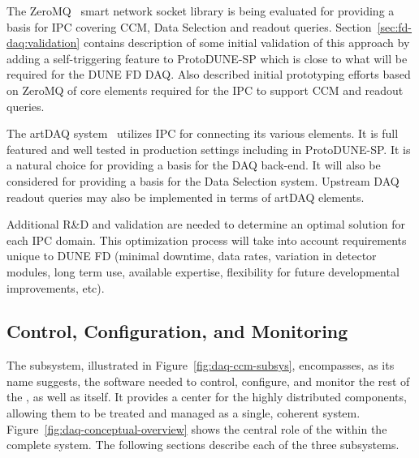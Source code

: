 The ZeroMQ~\cite{zeromq} smart network socket library is being evaluated for providing a basis for IPC covering CCM, Data Selection and readout queries.  
Section~\ref{sec:fd-daq:validation} contains description of some initial validation of this approach by adding a self-triggering feature to ProtoDUNE-SP which is close to what will be required for the DUNE FD DAQ.  Also described initial prototyping efforts based on ZeroMQ of core elements required for the IPC to support CCM and readout queries.

The artDAQ system~\cite{artdaq} utilizes IPC for connecting its various elements.  It is full featured and well tested in production settings including in ProtoDUNE-SP.  It is a natural choice for providing a basis for the DAQ back-end.  It will also be considered for providing a basis for the Data Selection system.  Upstream DAQ readout queries may also be implemented in terms of artDAQ elements.

Additional R\&D and validation are needed to determine an optimal solution for each IPC domain.  This optimization process will take into account requirements unique to DUNE FD (minimal downtime, data rates, variation in detector modules, long term use, available expertise, flexibility for future developmental improvements, etc).

\subsection{Control, Configuration, and Monitoring}
\label{sec:fd-daq:design-run-control}


The  subsystem, illustrated in Figure~\ref{fig:daq-ccm-subsys}, encompasses, as its name suggests, the software needed to control, configure, and monitor the rest of the , as well as itself. 
It provides a center for the highly distributed  components, allowing them to be treated and managed as a single, coherent system. 
Figure~\ref{fig:daq-conceptual-overview} shows the central role of the  within the complete  system.
The following sections describe each of the three  subsystems. 

